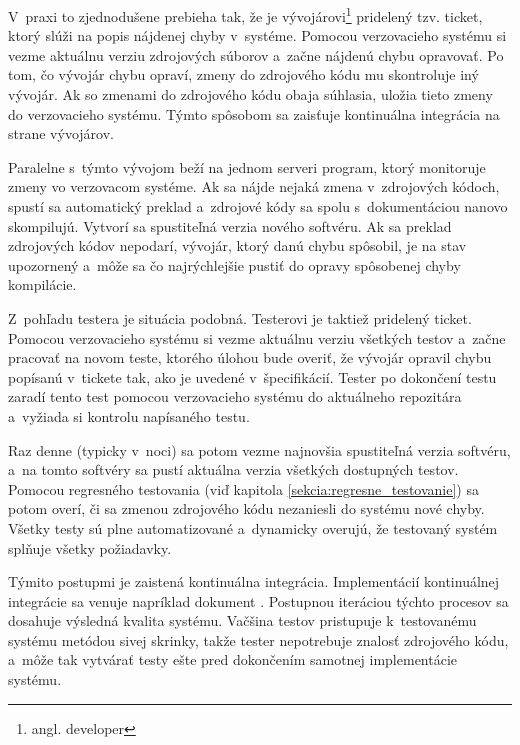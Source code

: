 V~praxi to zjednodušene prebieha tak, že je vývojárovi\footnote{angl. developer}
pridelený tzv. ticket, ktorý slúži na popis nájdenej chyby v~systéme. 
Pomocou verzovacieho systému si vezme aktuálnu verziu zdrojových súborov 
a~začne nájdenú chybu opravovať.
Po tom, čo vývojár chybu opraví, zmeny do zdrojového kódu mu skontroluje 
iný vývojár. Ak so zmenami do zdrojového kódu obaja súhlasia, uložia 
tieto zmeny do verzovacieho systému. Týmto spôsobom sa zaisťuje 
kontinuálna integrácia na strane vývojárov.

Paralelne s~týmto vývojom beží na jednom serveri program, ktorý 
monitoruje zmeny vo verzovacom systéme. Ak sa nájde nejaká zmena 
v~zdrojových kódoch, spustí sa automatický preklad a~zdrojové kódy sa 
spolu s~dokumentáciou nanovo skompilujú. Vytvorí sa spustiteľná verzia 
nového softvéru. Ak sa preklad zdrojových kódov nepodarí, vývojár, ktorý 
danú chybu spôsobil, je na stav upozornený a~môže sa čo najrýchlejšie 
pustiť do opravy spôsobenej chyby kompilácie.

Z~pohľadu testera je situácia podobná. Testerovi je taktiež pridelený 
ticket. Pomocou verzovacieho systému si vezme aktuálnu verziu
všetkých testov a~začne pracovať na novom teste, ktorého úlohou bude overiť, že vývojár 
opravil chybu popísanú v~tickete tak, ako je uvedené v~špecifikácií.
Tester po dokončení testu zaradí tento test pomocou verzovacieho 
systému do aktuálneho repozitára a~vyžiada si kontrolu napísaného testu. 

Raz denne (typicky v~noci) sa potom vezme najnovšia spustiteľná verzia 
softvéru, a~na tomto softvéry sa pustí aktuálna verzia všetkých dostupných 
testov. Pomocou regresného testovania 
(viď kapitola \ref{sekcia:regresne_testovanie}) sa potom overí, či sa 
zmenou zdrojového kódu nezaniesli do systému nové chyby. 
Všetky testy sú plne automatizované a~dynamicky overujú, že testovaný 
systém splňuje všetky požiadavky.

Týmito postupmi je zaistená kontinuálna integrácia. 
Implementácií kontinuálnej integrácie sa venuje napríklad dokument 
\cite{Continuous_integration_implementation}. 
Postupnou iteráciou týchto procesov sa dosahuje výsledná kvalita systému. 
Vačšina testov pristupuje k~testovanému systému metódou sivej skrinky, 
takže tester nepotrebuje znalosť zdrojového kódu, a~môže tak vytvárať 
testy ešte pred dokončením samotnej implementácie systému. 

